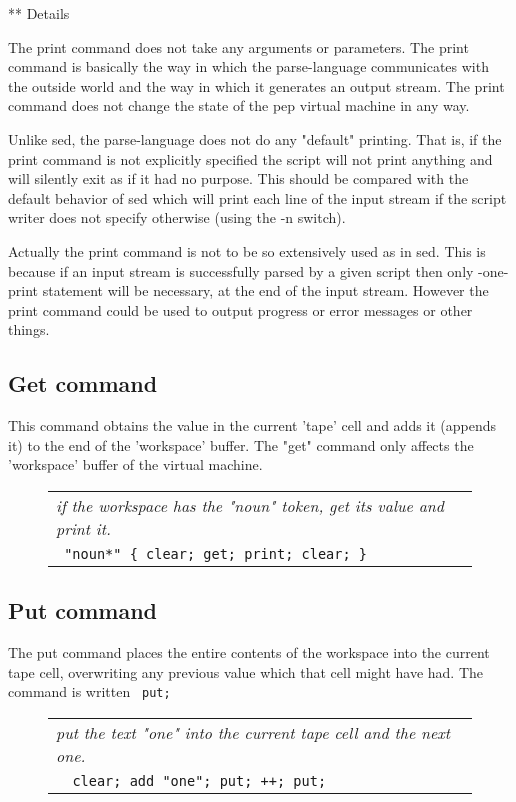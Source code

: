 \documentclass[a4paper,12pt]{article}
\begin{document}
** Details
 
  The print command does not take any arguments or parameters.
  The print command is basically the way in which the parse-language
  communicates with the outside world and the way in which it
  generates an output stream. The print command does not change
  the state of the pep virtual machine in any way.

  Unlike sed, the parse-language does not do any "default" printing.
  That is, if the print command is not explicitly specified the
  script will not print anything and will silently exit as if it
  had no purpose. This should be compared with the default
  behavior of sed which will print each line of the input stream if
  the script writer does not specify otherwise (using the -n switch).

  Actually the print command is not to be so extensively used as
  in sed. This is because if an input stream is successfully parsed
  by a given script then only -one- print statement will be necessary,
  at the end of the input stream. However the print command could be
  used to output progress or error messages or other things.
 

\subsection{Get command}

  This command obtains the value in the current 'tape' cell
  and adds it (appends it) to the end of the 'workspace' buffer.
  The "get" command only affects the 'workspace' buffer of the virtual
  machine.
 \begin{figure}
 \begin{tabular}{ l }
 \emph{ if the workspace has the "noun" token, get its value and print it. } \\ 
 \verb| "noun*" { clear; get; print; clear; } |
 \end{tabular} 
 \end{figure}

\subsection{Put command}

 The put command places the entire contents of the workspace
 into the current tape cell, overwriting any previous value
 which that cell might have had. The command is written 
 \verb| put; |

 \begin{figure}
 \begin{tabular}{ l }
 \emph{ put the text "one" into the current tape cell and the next one. } \\ 
 \verb|  clear; add "one"; put; ++; put; |
 \end{tabular} 
 \end{figure}
 
\end{document}
